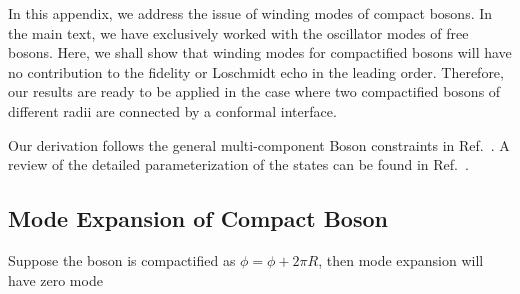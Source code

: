 
In this appendix, we address the issue of winding modes of compact bosons. In the main text, we have exclusively worked with the oscillator modes of free bosons. Here, we shall show that winding modes for compactified bosons will have no contribution to the fidelity or Loschmidt echo in the leading order. Therefore, our results are ready to be applied in the case where two compactified bosons of different radii are connected by a conformal interface\cite{PhysRevLett.118.136801}. 

Our derivation follows the general multi-component Boson constraints in Ref.~. A review of the detailed parameterization of the states can be found in Ref.~. 

\subsection{Mode Expansion of Compact Boson}
Suppose the boson is compactified as $\phi =  \phi + 2\pi R$, then mode expansion will have zero mode

